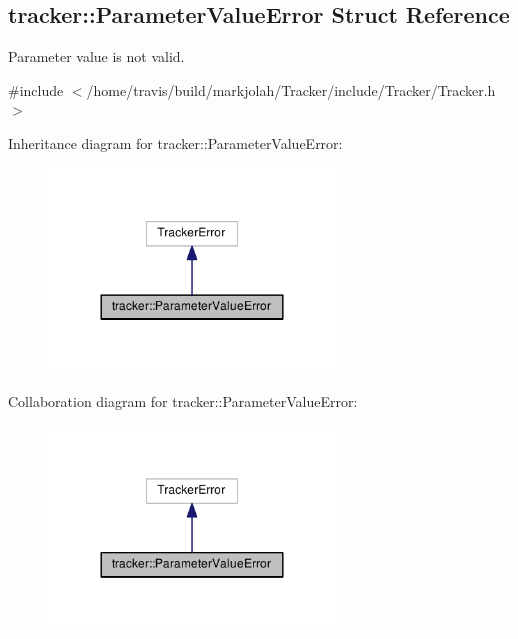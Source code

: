 \hypertarget{structtracker_1_1ParameterValueError}{}\subsection{tracker\+:\+:Parameter\+Value\+Error Struct Reference}
\label{structtracker_1_1ParameterValueError}


Parameter value is not valid.  




{\ttfamily \#include $<$/home/travis/build/markjolah/\+Tracker/include/\+Tracker/\+Tracker.\+h$>$}



Inheritance diagram for tracker\+:\+:Parameter\+Value\+Error\+:\nopagebreak
\begin{figure}[H]
\begin{center}
\leavevmode
\includegraphics[width=216pt]{structtracker_1_1ParameterValueError__inherit__graph}
\end{center}
\end{figure}


Collaboration diagram for tracker\+:\+:Parameter\+Value\+Error\+:\nopagebreak
\begin{figure}[H]
\begin{center}
\leavevmode
\includegraphics[width=216pt]{structtracker_1_1ParameterValueError__coll__graph}
\end{center}
\end{figure}
